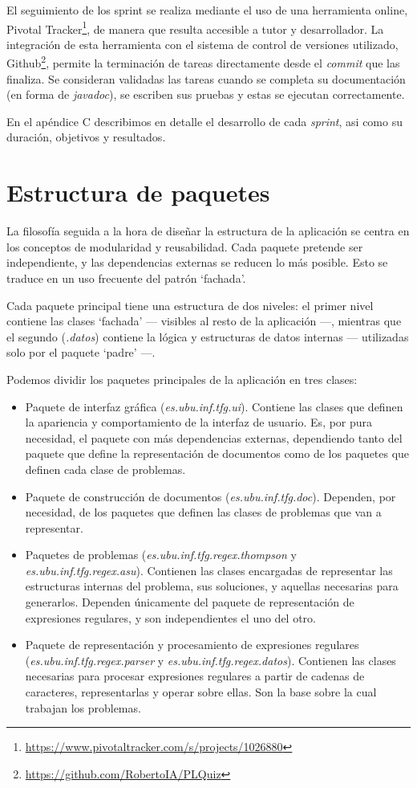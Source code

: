 El seguimiento de los sprint se realiza mediante el uso de una herramienta online, Pivotal Tracker\footnote{\url{https://www.pivotaltracker.com/s/projects/1026880}}, de manera que resulta accesible a tutor y desarrollador.
La integración de esta herramienta con el sistema de control de versiones utilizado, Github\footnote{\url{https://github.com/RobertoIA/PLQuiz}}, permite la terminación de tareas directamente desde el \emph{commit} que las finaliza.
Se consideran validadas las tareas cuando se completa su documentación (en forma de \emph{javadoc}), se escriben sus pruebas y estas se ejecutan correctamente.

En el apéndice C describimos en detalle el desarrollo de cada \emph{sprint}, asi como su duración, objetivos y resultados.

\section{Estructura de paquetes}
La filosofía seguida a la hora de diseñar la estructura de la aplicación se centra en los conceptos de modularidad y reusabilidad.
Cada paquete pretende ser independiente, y las dependencias externas se reducen lo más posible.
Esto se traduce en un uso frecuente del patrón `fachada'.

Cada paquete principal tiene una estructura de dos niveles: el primer nivel contiene las clases `fachada' --- visibles al resto de la aplicación ---, mientras que el segundo (\emph{.datos}) contiene la lógica y estructuras de datos internas --- utilizadas solo por el paquete `padre' ---.

Podemos dividir los paquetes principales de la aplicación en tres clases:
\begin{itemize}
	\item Paquete de interfaz gráfica (\emph{es.ubu.inf.tfg.ui}).
	Contiene las clases que definen la apariencia y comportamiento de la interfaz de usuario.
	Es, por pura necesidad, el paquete con más dependencias externas, dependiendo tanto del paquete que define la representación de documentos como de los paquetes que definen cada clase de problemas.
	\item Paquete de construcción de documentos (\emph{es.ubu.inf.tfg.doc}).
	Dependen, por necesidad, de los paquetes que definen las clases de problemas que van a representar.
	\item Paquetes de problemas (\emph{es.ubu.inf.tfg.regex.thompson} y \emph{es.ubu.inf.tfg.regex.asu}).
	Contienen las clases encargadas de representar las estructuras internas del problema, sus soluciones, y aquellas necesarias para generarlos.
	Dependen únicamente del paquete de representación de expresiones regulares, y son independientes el uno del otro.
	\item Paquete de representación y procesamiento de expresiones regulares (\emph{es.ubu.inf.tfg.regex.parser} y \emph{es.ubu.inf.tfg.regex.datos}).
	Contienen las clases necesarias para procesar expresiones regulares a partir de cadenas de caracteres, representarlas y operar sobre ellas.
	Son la base sobre la cual trabajan los problemas.
\end{itemize}


